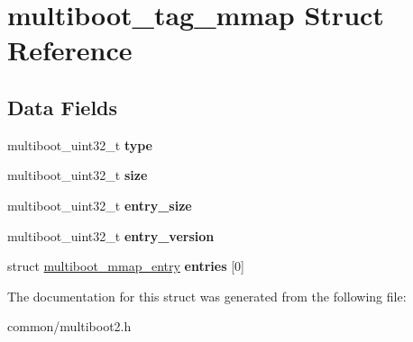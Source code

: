 \hypertarget{structmultiboot__tag__mmap}{}\section{multiboot\+\_\+tag\+\_\+mmap Struct Reference}
\label{structmultiboot__tag__mmap}
\subsection*{Data Fields}
\begin{DoxyCompactItemize}
\item 
multiboot\+\_\+uint32\+\_\+t {\bfseries type}\hypertarget{structmultiboot__tag__mmap_ae296eafd0f30c606ef2dcd3afda461d4}{}\label{structmultiboot__tag__mmap_ae296eafd0f30c606ef2dcd3afda461d4}

\item 
multiboot\+\_\+uint32\+\_\+t {\bfseries size}\hypertarget{structmultiboot__tag__mmap_a0663e47406ed5799d5bd55ccf2d4fa95}{}\label{structmultiboot__tag__mmap_a0663e47406ed5799d5bd55ccf2d4fa95}

\item 
multiboot\+\_\+uint32\+\_\+t {\bfseries entry\+\_\+size}\hypertarget{structmultiboot__tag__mmap_aa5532c68672471f9da8ba18a8a16857d}{}\label{structmultiboot__tag__mmap_aa5532c68672471f9da8ba18a8a16857d}

\item 
multiboot\+\_\+uint32\+\_\+t {\bfseries entry\+\_\+version}\hypertarget{structmultiboot__tag__mmap_af3b3d82da024d5ea2a7b817c6caea970}{}\label{structmultiboot__tag__mmap_af3b3d82da024d5ea2a7b817c6caea970}

\item 
struct \hyperlink{structmultiboot__mmap__entry}{multiboot\+\_\+mmap\+\_\+entry} {\bfseries entries} \mbox{[}0\mbox{]}\hypertarget{structmultiboot__tag__mmap_a20c4427afce786340b01ded5ed0532a2}{}\label{structmultiboot__tag__mmap_a20c4427afce786340b01ded5ed0532a2}

\end{DoxyCompactItemize}


The documentation for this struct was generated from the following file\+:\begin{DoxyCompactItemize}
\item 
common/multiboot2.\+h\end{DoxyCompactItemize}
